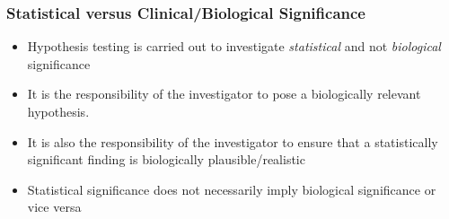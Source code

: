\documentclass[xcolor=x11names,compress]{beamer}\usepackage[]{graphicx}\usepackage[]{color}
\begin{document}





\begin{frame}
  \frametitle{Statistical versus Clinical/Biological Significance}
  \begin{itemize}
  \item Hypothesis testing is carried out to investigate
        {\it statistical} and not {\it biological} significance
  \item It is the responsibility of the investigator to 
        pose a biologically relevant hypothesis.
  \item It is also the responsibility of the investigator
        to ensure that a statistically significant finding
        is biologically plausible/realistic
  \item Statistical significance does not necessarily imply
        biological significance or vice versa
  \end{itemize}
\end{frame}
\end{document}
